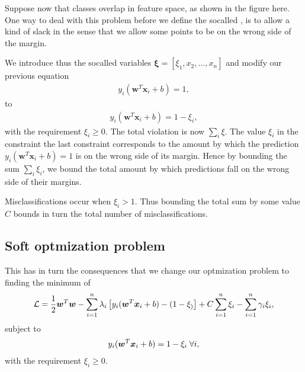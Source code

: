 \documentclass[letterpaper,10pt,english]{sphinxmanual}
\begin{document}
Suppose now that classes overlap in feature space, as shown in the
figure here. One way to deal with this problem before we define the
so\sphinxhyphen{}called , is to allow a kind of slack in the sense
that we allow some points to be on the wrong side of the margin.

We introduce thus the so\sphinxhyphen{}called  variables \(\boldsymbol{\xi} =[\xi_1,x_2,\dots,x_n]\) and
modify our previous equation
\begin{equation*}
\begin{split}
y_i(\boldsymbol{w}^T\boldsymbol{x}_i+b)=1,
\end{split}
\end{equation*}
to
\begin{equation*}
\begin{split}
y_i(\boldsymbol{w}^T\boldsymbol{x}_i+b)=1-\xi_i,
\end{split}
\end{equation*}
with the requirement \(\xi_i\geq 0\). The total violation is now \(\sum_i\xi\).
The value \(\xi_i\) in the constraint the last constraint corresponds to the  amount by which the prediction
\(y_i(\boldsymbol{w}^T\boldsymbol{x}_i+b)=1\) is on the wrong side of its margin. Hence by bounding the sum \(\sum_i \xi_i\),
we bound the total amount by which predictions fall on the wrong side of their margins.

Misclassifications occur when \(\xi_i > 1\). Thus bounding the total sum by some value \(C\) bounds in turn the total number of
misclassifications.


\subsection{Soft optmization problem}
\label{\detokenize{chapter7:soft-optmization-problem}}
This has in turn the consequences that we change our optmization problem to finding the minimum of
\begin{equation*}
\begin{split}
{\cal L}=\frac{1}{2}\boldsymbol{w}^T\boldsymbol{w}-\sum_{i=1}^n\lambda_i\left[y_i(\boldsymbol{w}^T\boldsymbol{x}_i+b)-(1-\xi_)\right]+C\sum_{i=1}^n\xi_i-\sum_{i=1}^n\gamma_i\xi_i,
\end{split}
\end{equation*}
subject to
\begin{equation*}
\begin{split}
y_i(\boldsymbol{w}^T\boldsymbol{x}_i+b)=1-\xi_i \hspace{0.1cm}\forall i,
\end{split}
\end{equation*}
with the requirement \(\xi_i\geq 0\).
\end{document}

